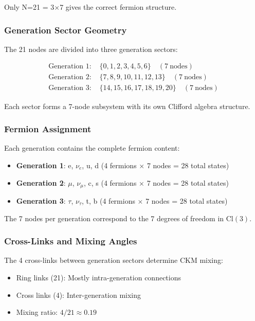\documentclass[12pt,a4paper]{article}
\begin{document}
Only N=21 = 3$\times$7 gives the correct fermion structure.

\subsubsection{Generation Sector Geometry}
The 21 nodes are divided into three generation sectors:

\begin{align}
\text{Generation 1: } &\{0, 1, 2, 3, 4, 5, 6\} \quad (7\ \text{nodes}) \\
\text{Generation 2: } &\{7, 8, 9, 10, 11, 12, 13\} \quad (7\ \text{nodes}) \\
\text{Generation 3: } &\{14, 15, 16, 17, 18, 19, 20\} \quad (7\ \text{nodes})
\end{align}

Each sector forms a 7-node subsystem with its own Clifford algebra structure.

\subsubsection{Fermion Assignment}
Each generation contains the complete fermion content:

\begin{itemize}
\item \textbf{Generation 1}: e, $\nu_e$, u, d (4 fermions $\times$ 7 nodes = 28 total states)
\item \textbf{Generation 2}: $\mu$, $\nu_\mu$, c, s (4 fermions $\times$ 7 nodes = 28 total states)
\item \textbf{Generation 3}: $\tau$, $\nu_\tau$, t, b (4 fermions $\times$ 7 nodes = 28 total states)
\end{itemize}

The 7 nodes per generation correspond to the 7 degrees of freedom in $\mathrm{Cl}(3)$.

\subsubsection{Cross-Links and Mixing Angles}
The 4 cross-links between generation sectors determine CKM mixing:

\begin{itemize}
\item Ring links (21): Mostly intra-generation connections
\item Cross links (4): Inter-generation mixing
\item Mixing ratio: $4/21 \approx 0.19$
\end{itemize}
\end{document}
